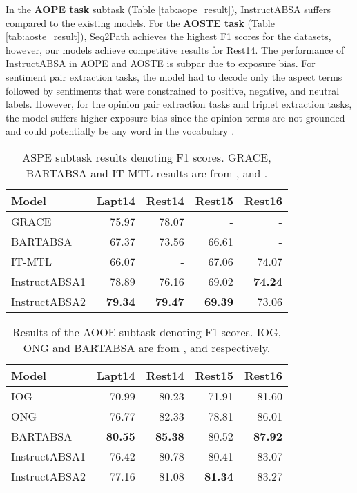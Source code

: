 \documentclass[11pt]{article}
\newcommand{\name}{\textsc{I}nstruct\textsc{ABSA}\xspace}
\begin{document}
In the \textbf{AOPE task} subtask (Table \ref{tab:aope_result}), \name{} suffers compared to the existing models. 
For the \textbf{AOSTE task} (Table \ref{tab:aoste_result}), Seq2Path achieves the highest F1 scores for the datasets, however, our models achieve competitive results for Rest14. 
The performance of \name{} in AOPE and AOSTE is subpar due to exposure bias. 
For sentiment pair extraction tasks, the model had to decode only the aspect terms followed by sentiments that were constrained to positive, negative, and neutral labels. 
However, for the opinion pair extraction tasks and triplet extraction tasks, the model suffers higher exposure bias since the opinion terms are not grounded and could potentially be any word in the vocabulary \cite{zhang-etal-2020-minimize}.


\begin{table}[t!]
\centering
\resizebox{\columnwidth}{!}
{
\begin{tabular}{lrrrr}
\hline
\textbf{Model} & \textbf{Lapt14} & \textbf{Rest14} & \textbf{Rest15} & \textbf{Rest16} \\ \hline
GRACE                       & 75.97     & 78.07     & -     & - \\ 
BARTABSA                       & 67.37     & 73.56     & 66.61     & - \\ 
IT-MTL                       & 66.07     & -      & 67.06    & 74.07 \\ 
\hline
\name{}1 & 78.89 & 76.16 & 69.02 & \textbf{74.24} \\
\name{}2 & \textbf{79.34} & \textbf{79.47} & \textbf{69.39} & 73.06 \\
\hline
\end{tabular}
}
\caption{ASPE subtask results denoting F1 scores. 
GRACE, BARTABSA and IT-MTL results are from \citet{luo-etal-2020-grace}, \citet{yan-etal-2021-unified} and \citet{varia2023instruction}.}
\label{tab:joint_result}
\end{table} \begin{table}[t!]
\centering
\resizebox{\columnwidth}{!}
{
\begin{tabular}{lrrrr}
\hline
\textbf{Model} & \textbf{Lapt14} & \textbf{Rest14} & \textbf{Rest15} & \textbf{Rest16} \\ \hline
IOG & 70.99  & 80.23    & 71.91   & 81.60 \\
ONG   & 76.77     & 82.33    & 78.81   & 86.01 \\
BARTABSA & \textbf{80.55}  & \textbf{85.38}    & 80.52   & \textbf{87.92} \\
\hline
\name{}1 & 76.42 & 80.78 & 80.41 & 83.07 \\
\name{}2 & 77.16 &81.08 & \textbf{81.34} & 83.27 \\
\hline
\end{tabular}
}
\caption{Results of the AOOE subtask denoting F1 scores. 
IOG, ONG and BARTABSA are from \citet{fan-etal-2019-target}, \citet{pouran-ben-veyseh-etal-2020-introducing} and \citet{yan-etal-2021-unified} respectively.
}
\label{tab:aooe_result}
\end{table}
\end{document}
